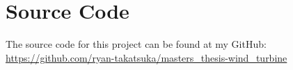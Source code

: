 
\chapter{Source Code} %

\label{AppendixA} %

The source code for this project can be found at my GitHub: \url{https://github.com/ryan-takatsuka/masters_thesis-wind_turbine}